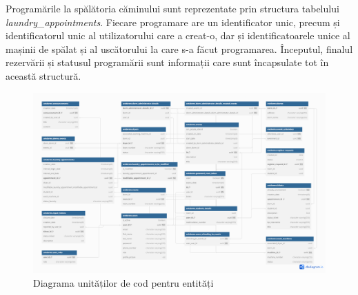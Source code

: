 \documentclass[12pt,a4paper]{report}
\theoremstyle{definition}
\theoremstyle{remark}
\begin{document}
\par Programările la spălătoria căminului sunt reprezentate prin structura tabelului \textit{laundry\_appointments}. Fiecare programare are un identificator unic, precum și identificatorul unic al utilizatorului care a creat-o, dar și identificatoarele unice al mașinii de spălat și al uscătorului la care s-a făcut programarea. Începutul, finalul rezervării  și statusul programării sunt informații care sunt încapsulate tot în această structură.

\begin{figure}[H]
    \centering
    \includegraphics[width=1\linewidth]{resurse/diagrame/database.png}
    \caption{Diagrama unităților de cod pentru entități}
\end{figure}



\end{document}
